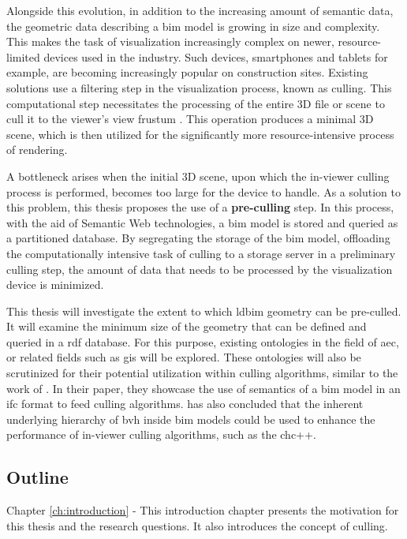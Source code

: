 \begin{refsection}
\begin{multicols}{2}
        Alongside this evolution, in addition to the increasing amount of semantic data, the geometric data describing a \ac{bim} model is growing in size and complexity. This makes the task of visualization increasingly complex on newer, resource-limited devices used in the industry. Such devices, smartphones and tablets for example, are becoming increasingly popular on construction sites. Existing solutions use a filtering step in the visualization process, known as culling. This computational step necessitates the processing of the entire 3D file or scene to cull it to the viewer's view frustum \parencite{Johansson2015}. This operation produces a minimal 3D scene, which is then utilized for the significantly more resource-intensive process of rendering.

        A bottleneck arises when the initial 3D scene, upon which the in-viewer culling process is performed, becomes too large for the device to handle. As a solution to this problem, this thesis proposes the use of a \textbf{pre-culling} step. In this process, with the aid of Semantic Web technologies, a \ac{bim} model is stored and queried as a partitioned database. By segregating the storage of the \ac{bim} model, offloading the computationally intensive task of culling to a storage server in a preliminary culling step, the amount of data that needs to be processed by the visualization device is minimized.

        This thesis will investigate the extent to which \ac{ldbim} geometry can be pre-culled. It will examine the minimum size of the geometry that can be defined and queried in a \ac{rdf} database. For this purpose, existing ontologies in the field of \ac{aec}, or related fields such as \ac{gis} will be explored. These ontologies will also be scrutinized for their potential utilization within culling algorithms, similar to the work of \cite{Johansson2009}. In their paper, they showcase the use of semantics of a \ac{bim} model in an \ac{ifc} format to feed culling algorithms. \cite{Johansson2015} has also concluded that the inherent underlying hierarchy of \ac{bvh} inside \ac{bim} models could be used to enhance the performance of in-viewer culling algorithms, such as the \ac{chc}++.

        \subsection*{Outline}
        \textsf{Chapter \ref{ch:introduction} -}
        This introduction chapter presents the motivation for this thesis and the research questions. It also introduces the concept of culling.


\end{multicols}
\end{refsection}

